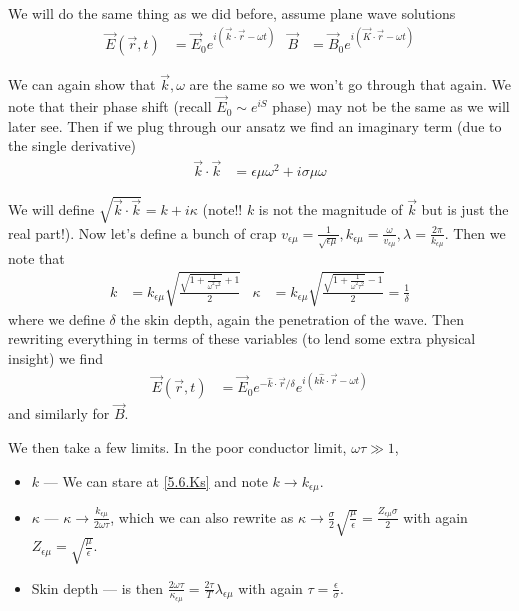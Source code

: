 \documentclass[10pt]{report}
\begin{document}
We will do the same thing as we did before, assume plane wave solutions
\begin{align}
    \vec{E}(\vec{r},t) &= \vec{E}_0 e^{i(\vec{k} \cdot \vec{r} - \omega t)} & \vec{B} &= \vec{B}_0 e^{i(\vec{K}\cdot \vec{r} - \omega t)}
\end{align}

We can again show that $\vec{k},\omega$ are the same so we won't go through that again. We note that their phase shift (recall $\vec{E}_0 \sim e^{iS}$ phase) may not be the same as we will later see. Then if we plug through our ansatz we find an imaginary term (due to the single derivative)
\begin{align}
    \vec{k} \cdot \vec{k} &= \epsilon \mu \omega^2 + i\sigma \mu \omega
\end{align}

We will define $\sqrt{\vec{k} \cdot \vec{k}} = k + i\kappa$ (note!! $k$ is not the magnitude of $\vec{k}$ but is just the real part!). Now let's define a bunch of crap $v_{\epsilon\mu} = \frac{1}{\sqrt{\epsilon \mu}}, k_{\epsilon\mu} = \frac{\omega}{v_{\epsilon\mu}}, \lambda = \frac{2\pi}{k_{\epsilon\mu}}$. Then we note that 
\begin{align}
    k &= k_{\epsilon\mu}\sqrt{\frac{\sqrt{1 + \frac{1}{\omega^2 \tau^2}}+1}{2}} & \kappa &= k_{\epsilon\mu}\sqrt{\frac{\sqrt{1 + \frac{1}{\omega^2\tau^2}}-1}{2}} = \frac{1}{\delta}\label{5.6.Ks}
\end{align}
where we define $\delta$ the skin depth, again the penetration of the wave. Then rewriting everything in terms of these variables (to lend some extra physical insight) we find
\begin{align}
    \vec{E}(\vec{r},t) &= \vec{E}_0 e^{-\hat{k} \cdot \vec{r}/\delta}e^{i(k\hat{k}\cdot \vec{r} - \omega t)}
\end{align}
and similarly for $\vec{B}$.

We then take a few limits. In the poor conductor limit, $\omega \tau \gg 1$, 
\begin{itemize}
    \item $k$ --- We can stare at \eqref{5.6.Ks} and note $k \to k_{\epsilon \mu}$.
    \item $\kappa$ --- $\kappa \to \frac{k_{\epsilon\mu}}{2\omega \tau}$, which we can also rewrite as $\kappa \to \frac{\sigma}{2}\sqrt{\frac{\mu}{\epsilon}} = \frac{Z_{\epsilon\mu}\sigma}{2}$ with again $Z_{\epsilon\mu} = \sqrt{\frac{\mu}{\epsilon}}$. 
    \item Skin depth ---  is then $\frac{2\omega \tau}{\kappa_{\epsilon\mu}} = \frac{2\tau}{T}\lambda_{\epsilon \mu}$ with again $\tau = \frac{\epsilon}{\sigma}$. 
\end{itemize}
\end{document}
